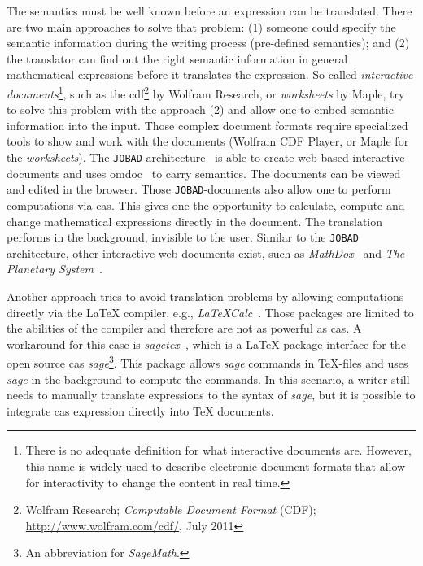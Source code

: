 \documentclass[a4paper,11pt]{article}
\newcommand{\Maple}{Maple}
\newcommand{\JOBAD}{{\tt JOBAD}}
\theoremstyle{defTheoStyle}
\theoremstyle{defExampStyle}
\begin{document}
The semantics must be well known before an expression can be translated. There are two main approaches to solve that problem: (1) someone could specify the semantic information during the writing process (pre-defined semantics); and (2) the translator can find out the right semantic information in general mathematical expressions before it translates the expression. So-called \textit{interactive documents}\footnote{There is no adequate definition for what interactive documents are. However, this name is widely used to describe electronic document formats that allow for interactivity to change the content in real time.}, such as the \gls*{cdf}\footnote{Wolfram Research; \textit{Computable Document Format} (CDF); \url{http://www.wolfram.com/cdf/}, July 2011} by Wolfram Research, or \textit{worksheets} by \Maple{}, try to solve this problem with the approach (2) and allow one to embed semantic information into the input. Those complex document formats require specialized tools to show and work with the documents (Wolfram CDF Player, or \Maple{} for the \textit{worksheets}). The \JOBAD{} architecture~\parencite{JOBAD:orig} is able to create web-based interactive documents and uses \gls*{omdoc}~\parencite{OMDoc} to carry semantics. The documents can be viewed and edited in the browser. Those \JOBAD{-documents} also allow one to perform computations via \gls*{cas}. This gives one the opportunity to calculate, compute and change mathematical expressions directly in the document. The translation performs in the background, invisible to the user. Similar to the \JOBAD{} architecture, other interactive web documents exist, such as \textit{MathDox}~\parencite{MathDox} and \textit{The Planetary System}~\parencite{Planetary}.

Another approach tries to avoid translation problems by allowing computations directly via the \LaTeX{} compiler, e.g., \textit{LaTeXCalc}~\parencite{LatexCalc}. Those packages are limited to the abilities of the compiler and therefore are not as powerful as \gls*{cas}. A workaround for this case is \textit{sagetex}~\parencite{Sagetex}, which is a \LaTeX{} package interface for the open source \gls*{cas} \textit{sage}\footnote{An abbreviation for \textit{SageMath}.}. This package allows \textit{sage} commands in \TeX{-}files and uses \textit{sage} in the background to compute the commands. In this scenario, a writer still needs to manually translate expressions to the syntax of \textit{sage}, but it is possible to integrate \gls*{cas} expression directly into \TeX{} documents.
\end{document}
